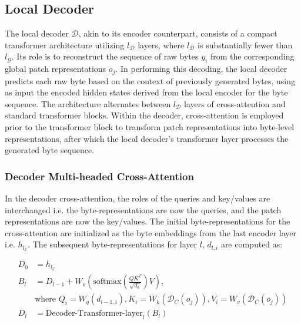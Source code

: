\subsection{Local Decoder} 

The local decoder $\mathcal{D}$, akin to its encoder counterpart, consists of a compact transformer architecture utilizing $l_{\mathcal{D}}$ layers, where $l_{\mathcal{D}}$ is substantially fewer than $l_{\mathcal{G}}$. Its role is to reconstruct the sequence of raw bytes $y_i$ from the corresponding global patch representations $o_j$. In performing this decoding, the local decoder predicts each raw byte based on the context of previously generated bytes, using as input the encoded hidden states derived from the local encoder for the byte sequence. The architecture alternates between $l_{\mathcal{D}}$ layers of cross-attention and standard transformer blocks. Within the decoder, cross-attention is employed prior to the transformer block to transform patch representations into byte-level representations, after which the local decoder’s transformer layer processes the generated byte sequence.

\subsubsection{Decoder Multi-headed Cross-Attention} 

In the decoder cross-attention, the roles of the queries and key/values are interchanged i.e. the byte-representations are now the queries, and the patch representations are now the key/values. The initial byte-representations for the cross-attention are initialized as the byte embeddings from the last encoder layer i.e. $h_{l_{\mathcal{E}}}$. The subsequent byte-representations for layer $l$, $d_{l,i}$ are computed as:

\begin{align}
D_0 &= h_{l_{\mathcal{E}}} \\
B_l &= D_{l-1} + W_o\left(\text{softmax}\left(\frac{QK^T}{\sqrt{d_k}}\right)V\right), \\
  &\text{where } Q_i = W_q(d_{l-1,i}), K_i = W_k(\mathcal{D}_C(o_j)), V_i = W_v(\mathcal{D}_C(o_j)) \\
  D_l &= \text{Decoder-Transformer-layer}_l(B_l)
\end{align}

